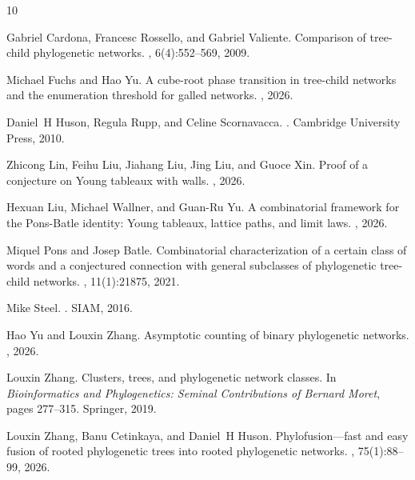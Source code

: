 \documentclass[11pt]{article}
\theoremstyle{definition}
\theoremstyle{remark}
\begin{document}
\begin{thebibliography}{10}

Gabriel Cardona, Francesc Rossello, and Gabriel Valiente.
\newblock Comparison of tree-child phylogenetic networks.
, 6(4):552--569, 2009.

Michael Fuchs and Hao Yu.
\newblock A cube-root phase transition in tree-child networks and the enumeration threshold for galled networks.
, 2026.

Daniel~H Huson, Regula Rupp, and Celine Scornavacca.
.
\newblock Cambridge University Press, 2010.

Zhicong Lin, Feihu Liu, Jiahang Liu, Jing Liu, and Guoce Xin.
\newblock Proof of a conjecture on {Young} tableaux with walls.
, 2026.

Hexuan Liu, Michael Wallner, and Guan-Ru Yu.
\newblock A combinatorial framework for the {Pons}-{Batle} identity: Young tableaux, lattice paths, and limit laws.
, 2026.

Miquel Pons and Josep Batle.
\newblock Combinatorial characterization of a certain class of words and a conjectured connection with general subclasses of phylogenetic tree-child networks.
, 11(1):21875, 2021.

Mike Steel.
.
\newblock SIAM, 2016.

Hao Yu and Louxin Zhang.
\newblock Asymptotic counting of binary phylogenetic networks.
, 2026.

Louxin Zhang.
\newblock Clusters, trees, and phylogenetic network classes.
\newblock In {\em Bioinformatics and Phylogenetics: Seminal Contributions of Bernard Moret}, pages 277--315. Springer, 2019.

Louxin Zhang, Banu Cetinkaya, and Daniel~H Huson.
\newblock Phylofusion—fast and easy fusion of rooted phylogenetic trees into rooted phylogenetic networks.
, 75(1):88--99, 2026.

\end{thebibliography}
\end{document}
